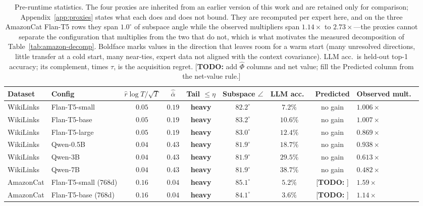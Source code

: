 \documentclass{article}
\theoremstyle{definition}
\theoremstyle{remark}
\theoremstyle{remark}
\newcommand{\todo}[1]{\textcolor{red!70!black}{[\textbf{TODO:} #1]}}
\begin{document}
\begin{table}[h]
\centering
\caption{Pre-runtime statistics. The four proxies are inherited from an earlier
version of this work and are retained only for comparison; Appendix~\ref{app:proxies}
states what each does and does not bound. They are recomputed per expert here,
and on the three AmazonCat Flan-T5 rows they span $1.0^\circ$ of subspace angle
while the observed multipliers span $1.14\times$ to $2.73\times$---the proxies
cannot separate the configuration that multiplies from the two that do not,
which is what motivates the measured decomposition of
Table~\ref{tab:amazon-decomp}. Boldface marks values in the direction that leaves room for a
warm start (many unresolved directions, little transfer at a cold start,
many near-ties, expert data not aligned with the context covariance). LLM
acc.\ is held-out top-1 accuracy; its complement, times $\tau$, is the
acquisition regret. \todo{add $\widehat\Phi$ columns and net value; fill
the Predicted column from the net-value rule.}}
\label{tab:diagnostics}
\scriptsize
\setlength{\tabcolsep}{3pt}
\begin{tabular}{@{}llccccccl@{}}
\toprule
Dataset & Config & $\widehat r\log T/\sqrt T$ & $\widehat{\bar\alpha}$ & Tail $\le\eta$ & Subspace $\angle$ & LLM acc.\ & Predicted & Observed mult.\ \\
\midrule
WikiLinks & Flan-T5-small  & $0.05$ & $0.19$ & \textbf{heavy} & $\mathbf{82.2^\circ}$ & $7.2\%$ & no gain & $1.006\times$ \\
WikiLinks & Flan-T5-base   & $0.05$ & $0.19$ & \textbf{heavy} & $\mathbf{83.2^\circ}$ & $10.6\%$ & no gain & $1.007\times$ \\
WikiLinks & Flan-T5-large  & $0.05$ & $0.19$ & \textbf{heavy} & $\mathbf{83.0^\circ}$ & $12.4\%$ & no gain & $0.869\times$ \\
WikiLinks & Qwen-0.5B      & $0.04$ & $0.43$ & \textbf{heavy} & $\mathbf{81.9^\circ}$ & $18.7\%$ & no gain & $0.938\times$ \\
WikiLinks & Qwen-3B        & $0.04$ & $0.43$ & \textbf{heavy} & $\mathbf{81.9^\circ}$ & $29.5\%$ & no gain & $0.613\times$ \\
WikiLinks & Qwen-7B        & $0.04$ & $0.43$ & \textbf{heavy} & $\mathbf{81.9^\circ}$ & $38.7\%$ & no gain & $0.482\times$ \\
\midrule
AmazonCat & Flan-T5-small (768d) & $\mathbf{0.16}$ & $\mathbf{0.04}$ & \textbf{heavy} & $\mathbf{85.1^\circ}$ & $5.2\%$ & \todo{} & $1.59\times$ \\
AmazonCat & Flan-T5-base (768d)  & $\mathbf{0.16}$ & $\mathbf{0.04}$ & \textbf{heavy} & $\mathbf{84.1^\circ}$ & $3.6\%$ & \todo{} & $1.14\times$ \\

\end{tabular}
\end{table}
\end{document}
